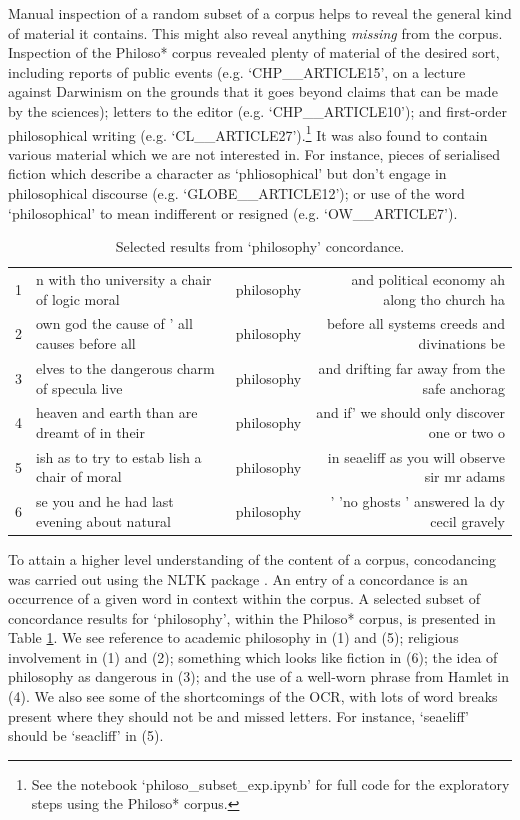 \documentclass{article}
\begin{document}
Manual inspection of a random subset of a corpus helps to reveal the general kind of material it contains. This might also reveal anything \textit{missing} from the corpus. Inspection of the Philoso* corpus revealed plenty of material of the desired sort, including reports of public events (e.g. `CHP\_\_\-ARTICLE15', on a lecture against Darwinism on the grounds that it goes beyond claims that can be made by the sciences); letters to the editor (e.g. `CHP\_\_\-ARTICLE10'); and first-order philosophical writing (e.g. `CL\_\_\-ARTICLE27').\footnote{See the notebook `philoso\_\-subset\_\-exp.ipynb' for full code for the exploratory steps using the Philoso* corpus.} It was also found to contain various material which we are not interested in. For instance, pieces of serialised fiction which describe a character as `phliosophical' but don't engage in philosophical discourse (e.g. `GLOBE\_\_\-ARTICLE12'); or use of the word `philosophical' to mean indifferent or resigned (e.g. `OW\_\_\-ARTICLE7').

\begin{table}[]
        \footnotesize
        \centering
        \begin{tabular}{l|lcr}
        1 & n with tho university a chair of logic moral & philosophy & and political economy ah along tho church ha \\
        2 & own god the cause of ' all causes before all & philosophy & before all systems creeds and divinations be \\
        3 & elves to the dangerous charm of specula live & philosophy & and drifting far away from the safe anchorag \\
        4 & heaven and earth than are dreamt of in their & philosophy & and if' we should only discover one or two o \\
        5 & ish as to try to estab lish a chair of moral & philosophy & in seaeliff as you will observe sir mr adams \\
        6 & se you and he had last evening about natural & philosophy & ' 'no ghosts ' answered la dy cecil gravely \\
        \end{tabular}
        \caption{Selected results from `philosophy' concordance.}
        \label{t:corpus-concordance}
\end{table}

To attain a higher level understanding of the content of a corpus, concodancing was carried out using the NLTK package \cite{bird-2009}. An entry of a concordance is an occurrence of a given word in context within the corpus. A selected subset of concordance results for `philosophy', within the Philoso* corpus, is presented in Table \ref{t:corpus-concordance}. We see reference to academic philosophy in (1) and (5); religious involvement in (1) and (2); something which looks like fiction in (6); the idea of philosophy as dangerous in (3); and the use of a well-worn phrase from Hamlet in (4). We also see some of the shortcomings of the OCR, with lots of word breaks present where they should not be and missed letters. For instance, `seaeliff' should be `seacliff' in (5).
\end{document}
